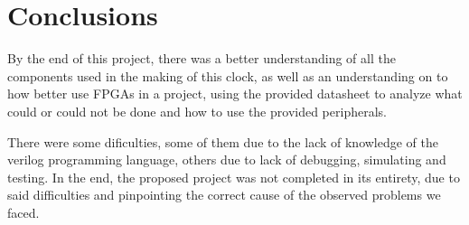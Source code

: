 \section{Conclusions}
\label{sec:conc}

By the end of this project, there was a better understanding of all the components used in the making of this clock, as well as an understanding on to how better use FPGAs in a project, using the provided datasheet to analyze what could or could not be done and how to use the provided peripherals.

There were some dificulties, some of them due to the lack of knowledge of the verilog programming language, others due to lack of debugging, simulating and testing. In the end, the proposed project was not completed in its entirety, due to said difficulties and pinpointing the correct cause of the observed problems we faced.